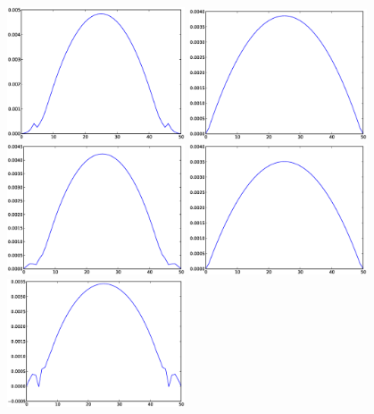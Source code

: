 \documentclass{article}
\begin{document}
\begin{figure}
\includegraphics[width=0.47\textwidth]{Figures/vel_bubble_force_width_6.eps}
\hfill
\includegraphics[width=0.47\textwidth]{Figures/vel_bulk_force_width_6.eps}\\
\includegraphics[width=0.47\textwidth]{Figures/vel_bubble_force_width_10.eps}
\hfill
\includegraphics[width=0.47\textwidth]{Figures/vel_bulk_force_width_10.eps}\\
\includegraphics[width=0.47\textwidth]{Figures/vel_bubble_force_width_14.eps}

\end{figure}
\end{document}
